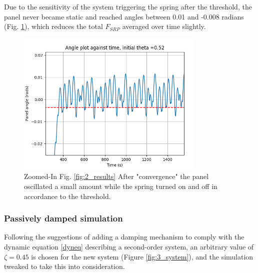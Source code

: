Due to the sensitivity of the system triggering the spring after the threshold, the panel never became static and reached angles between 0.01 and -0.008 radians (Fig. \ref{tinyoscillations}), which reduces the total $F_{SRP}$ averaged over time slightly.

\begin{figure}[H]
\centering
\includegraphics[width=0.8\textwidth]{images/second/tinyoscillations.png}
\caption{Zoomed-In Fig. \ref{fig:2_results} After "convergence" the panel oscillated a small amount while the spring turned on and off in accordance to the threshold.}
\label{tinyoscillations}
\end{figure}

\subsubsection{Passively damped simulation}\label{res:pasdamp}

Following the suggestions of adding a damping mechanism to comply with the dynamic equation \ref{dyneq} describing a second-order system, an arbitrary value of $\zeta = 0.45$ is chosen for the new system (Figure \ref{fig:3_system}), and the simulation tweaked to take this into consideration.


%

